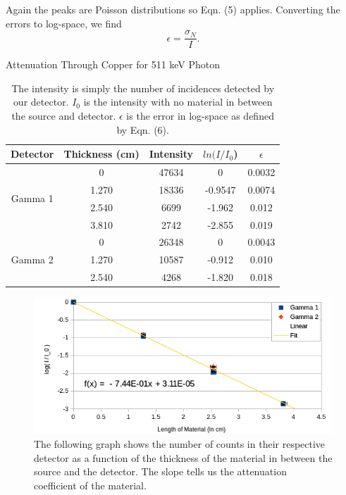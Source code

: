 \documentclass[10pt]{IEEEtran}
\begin{document}
Again the peaks are Poisson distributions so Eqn. (5) applies. Converting the errors to log-space, we find
    \begin{equation}
    	\epsilon = \frac{\sigma_N}{I}.
    \end{equation}
    \begin{center}
    \begin{table}[!hpbt]
      \begin{center}
        \normalsize{Attenuation Through Copper for 511 keV Photon}
        \begin{tabular}{|c|c|c|c|c|}	
		   \hline        	
		   Detector & Thickness (cm) & Intensity & $ln(I/I_0$) & $\epsilon$ \\
            \hline
            \multirow{4}{*}{Gamma 1} & 0 & 47634 & 0 & 0.0032 \\
            \hhline{~----}
	        & 1.270 & 18336 & -0.9547 & 0.0074 \\
	        \hhline{~----}
            & 2.540 & 6699 & -1.962 & 0.012 \\
            \hhline{~----}
            & 3.810 & 2742 & -2.855 & 0.019 \\
            \hline
            \multirow{3}{*}{Gamma 2} & 0 & 26348 & 0 & 0.0043 \\
            \hhline{~----}
            & 1.270 & 10587 & -0.912 & 0.010 \\
            \hhline{~----}
            & 2.540 & 4268 & -1.820 & 0.018 \\
            \hline
       \end{tabular}
       \caption{The intensity is simply the number of incidences detected by our detector. $I_0$ is the intensity with no material in between the source and detector. $\epsilon$ is the error in log-space as defined by Eqn. (6).}
       \label{tab:copper511}
      \end{center}
    \end{table}  
    \begin{figure}[!hbpt]
			\includegraphics[width=\linewidth]{Attenuation511Cu}
			\caption{The following graph shows the number of counts in their respective detector as a function of the thickness of the material in between the source and the detector. The slope tells us the attenuation coefficient of the material.}
			\label{fig:511Cu}
    \end{figure}  
\end{center}
 
\end{document}
